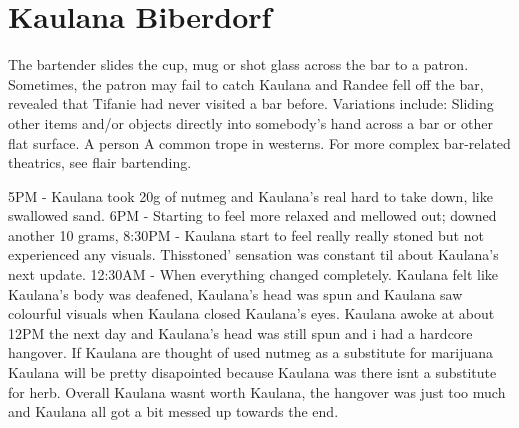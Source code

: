 \documentclass[12pt]{book}
\begin{document}
\chapter{Kaulana Biberdorf}

The bartender slides the cup, mug or shot glass across the bar to a patron. Sometimes, the patron may fail to catch Kaulana and Randee fell off the bar, revealed that Tifanie had never visited a bar before. Variations include: Sliding other items and/or objects directly into somebody's hand across a bar or other flat surface. A person A common trope in westerns. For more complex bar-related theatrics, see flair bartending.



5PM - Kaulana took 20g of nutmeg and Kaulana's real hard to take down, like swallowed sand. 6PM - Starting to feel more relaxed and mellowed out; downed another 10 grams, 8:30PM - Kaulana start to feel really really stoned but not experienced any visuals. Thisstoned' sensation was constant til about Kaulana's next update. 12:30AM - When everything changed completely. Kaulana felt like Kaulana's body was deafened, Kaulana's head was spun and Kaulana saw colourful visuals when Kaulana closed Kaulana's eyes. Kaulana awoke at about 12PM the next day and Kaulana's head was still spun and i had a hardcore hangover. If Kaulana are thought of used nutmeg as a substitute for marijuana Kaulana will be pretty disapointed because Kaulana was there isnt a substitute for herb. Overall Kaulana wasnt worth Kaulana, the hangover was just too much and Kaulana all got a bit messed up towards the end.
\end{document}

